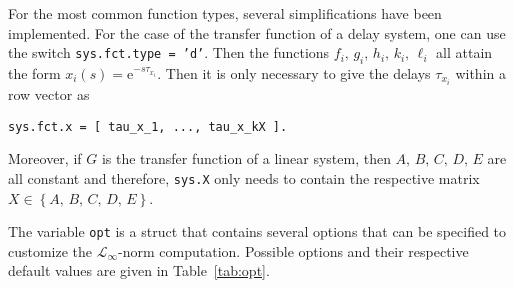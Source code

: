 \documentclass[10pt,a4paper]{article}
\begin{document}
For the most common function types, several simplifications have been implemented. For the case of the transfer function of a delay system, one can use the switch \texttt{sys.fct.type = 'd'}. Then the functions $f_i,\,g_i,\,h_i,\,k_i,\,\ell_i$ all attain the form $x_i(s) = \mathrm{e}^{-s\tau_{x_i}}$. Then it is only necessary to give the delays $\tau_{x_i}$ within a row vector as
\begin{verbatim}
sys.fct.x = [ tau_x_1, ..., tau_x_kX ].
\end{verbatim}
Moreover, if $G$ is the transfer function of a linear system, then $A,\,B,\,C,\,D,\,E$ are all constant and therefore, \texttt{sys.X} only needs to contain the respective matrix $X \in \left\{ A,\,B,\,C,\,D,\,E \right\}$.

The variable \texttt{opt} is a struct that contains several options that can be specified to customize the $\mathcal{L}_\infty$-norm computation. Possible options and their respective default values are given in Table~\ref{tab:opt}.
\end{document}
